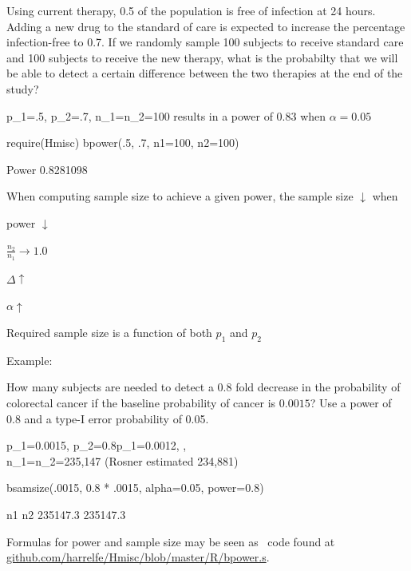 Using current therapy, 0.5 of the population is free of infection at 24 hours.  Adding a new drug to the standard of care is expected to increase the percentage infection-free to 0.7.  If we randomly sample 100 subjects to receive standard care and 100 subjects to receive the new therapy, what is the probabilty that we will be able to detect a certain difference between the two therapies at the end of the study?

\beq
p_{1}=.5, p_{2}=.7, n_{1}=n_{2}=100
\eeq
results in a power of 0.83 when $\alpha=0.05$
\begin{Schunk}
\begin{Sinput}
require(Hmisc)
bpower(.5, .7, n1=100, n2=100)
\end{Sinput}
\begin{Soutput}
    Power 
0.8281098 
\end{Soutput}
\end{Schunk}
\item When computing sample size to achieve a given power, the sample
  size $\downarrow$ when
 \bi
 \item power $\downarrow$
 \item $\frac{n_{2}}{n_{1}} \rightarrow 1.0$
 \item $\Delta \uparrow$
 \item $\alpha \uparrow$
 \ei
\item Required sample size is a function of both $p_{1}$ and $p_{2}$
\item Example:

How many subjects are needed to detect a 0.8 fold decrease in the probability of colorectal cancer if the baseline probability of cancer is $0.0015$?  Use a power of 0.8 and a type-I error probability of 0.05.

\beqa
p_{1}=0.0015, p_{2}=0.8\times p_{1}=0.0012, ,  \\
n_{1}=n_{2}=235,147
\eeqa
(Rosner estimated 234,881)
\ei
\begin{Schunk}
\begin{Sinput}
bsamsize(.0015, 0.8 * .0015, alpha=0.05, power=0.8)
\end{Sinput}
\begin{Soutput}
      n1       n2 
235147.3 235147.3 
\end{Soutput}
\end{Schunk}

Formulas for power and sample size may be seen as \R\ code found at\\
\href{https://github.com/harrelfe/Hmisc/blob/master/R/bpower.s}{github.com/harrelfe/Hmisc/blob/master/R/bpower.s}.

